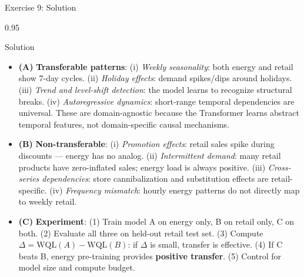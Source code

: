 \documentclass[9pt, aspectratio=169, t]{beamer}
\begin{document}
\begin{frame}{Exercise 9: Solution}
    \begin{cminipage}{0.95\textwidth}
    \begin{exampleblock}{Solution}
        {\scriptsize
        \begin{itemize}\setlength{\itemsep}{1pt}
            \item \textcolor{MainBlue}{\textbf{(A)}} \textbf{Transferable patterns}: (i) \textit{Weekly seasonality}: both energy and retail show 7-day cycles. (ii) \textit{Holiday effects}: demand spikes/dips around holidays. (iii) \textit{Trend and level-shift detection}: the model learns to recognize structural breaks. (iv) \textit{Autoregressive dynamics}: short-range temporal dependencies are universal. These are domain-agnostic because the Transformer learns abstract temporal features, not domain-specific causal mechanisms.
            \item \textcolor{MainBlue}{\textbf{(B)}} \textbf{Non-transferable}: (i) \textit{Promotion effects}: retail sales spike during discounts --- energy has no analog. (ii) \textit{Intermittent demand}: many retail products have zero-inflated sales; energy load is always positive. (iii) \textit{Cross-series dependencies}: store cannibalization and substitution effects are retail-specific. (iv) \textit{Frequency mismatch}: hourly energy patterns do not directly map to weekly retail.
            \item \textcolor{MainBlue}{\textbf{(C)}} \textbf{Experiment}: (1) Train model A on energy only, B on retail only, C on both. (2) Evaluate all three on held-out retail test set. (3) Compute $\Delta = \text{WQL}(A) - \text{WQL}(B)$: if $\Delta$ is small, transfer is effective. (4) If C beats B, energy pre-training provides \textbf{positive transfer}. (5) Control for model size and compute budget.
        \end{itemize}
        }
    \end{exampleblock}
    \end{cminipage}
\end{frame}
\end{document}
